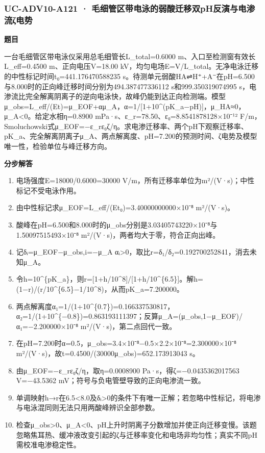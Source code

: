 \documentclass[UTF8,11pt,a4paper]{ctexart}
\begin{document}
\subsubsection*{UC-ADV10-A121 · 毛细管区带电泳的弱酸迁移双pH反演与电渗流ζ电势}
\noindent\textbf{题目}\par
一台毛细管区带电泳仪采用总毛细管长L\_total=0.6000 m、入口至检测窗有效长L\_eff=0.4500 m、正向电压V=18.00 kV，均匀电场E=V/L\_total。无净电泳迁移的中性标记时间t₀=441.176470588235 s。待测单元弱酸HA⇌H⁺+A⁻在pH=6.500与8.000时的正向峰迁移时间分别为494.387477336112 s和999.350319074995 s，电渗流比完全解离阴离子的逆向电泳快，故峰仍能到达正向检测端。模型μ\_obs=L\_eff/(Et)=μ\_EOF+αμ\_A，α=1/[1+10\textasciicircum{}(pK\_a−pH)]，μ\_HA≈0，μ\_A<0。给定水相η=0.8900 mPa·s、ε\_r=78.50、ε₀=8.8541878128×10⁻¹² F/m，Smoluchowski式μ\_EOF=−ε\_rε₀ζ/η。求电渗迁移率、两个pH下观察迁移率、pK\_a、完全解离阴离子μ\_A、两点解离度、pH=7.200的预测时间、ζ电势及模型唯一性，检验单位与峰迁移方向。\par
\medskip\noindent\textbf{分步解答}
\begin{enumerate}
\item 电场强度E=18000/0.6000=30000 V/m，所有迁移率单位为m²/(V·s)；中性标记不受电泳作用。
\item 由中性标记求μ\_EOF=L\_eff/(Et₀)=3.40000000000×10⁻⁸ m²/(V·s)。
\item 酸峰在pH=6.500和8.000时的μ\_obs分别是3.03405743220×10⁻⁸与1.50097515493×10⁻⁸ m²/(V·s)，两者均大于零，符合正向出峰。
\item 记δᵢ=μ\_EOF−μ\_obs,i=−μ\_A αᵢ>0，取比r=δ₁/δ₂=0.192700252841，消去未知μ\_A。
\item 令h=10\textasciicircum{}\{pK\_a\}，则r=[1+h/10\textasciicircum{}8]/[1+h/10\textasciicircum{}\{6.5\}]。解h=(1−r)/(r/10\textasciicircum{}\{6.5\}−1/10\textasciicircum{}8)，从而pK\_a=7.200000。
\item 两点解离度α₁=1/(1+10\textasciicircum{}\{0.7\})=0.166337530817，α₂=1/(1+10\textasciicircum{}\{−0.8\})=0.863193111397；反算μ\_A=(μ\_obs,1−μ\_EOF)/α₁=−2.200000×10⁻⁸ m²/(V·s)，第二点回代一致。
\item 在pH=7.200时α=0.5，μ\_obs=3.4×10⁻⁸−0.5×2.2×10⁻⁸=2.300000×10⁻⁸ m²/(V·s)，故t=0.4500/(30000μ\_obs)=652.173913043 s。
\item 由μ\_EOF=−ε\_rε₀ζ/η，取η=0.0008900 Pa·s，得ζ=−0.0435362017563 V=−43.5362 mV；符号与负电管壁导致的正向电渗流一致。
\item 单调映射h→r在6.5<8.0及δᵢ>0的条件下有唯一正解；若忽略中性标记，将电渗与电泳混同则无法只用两酸峰辨识全部参数。
\item 检查μ\_obs>0、μ\_A<0、pH上升时阴离子分数增加并使正向迁移变慢。该题忽略焦耳热、缓冲液改变引起的ζ与迁移率变化和电场非均匀性；真实不同pH需校准电渗稳定性。
\end{enumerate}
\end{document}
